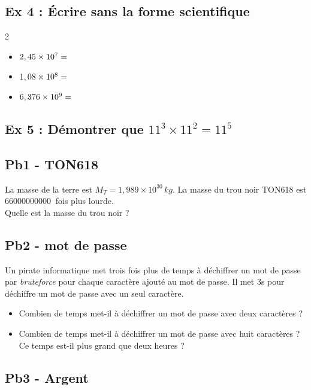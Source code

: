 \subsection*{Ex 4 : Écrire sans la forme scientifique}
\begin{multicols}{2}
  \begin{itemize}[label={$\bullet$}]
  \item $ 2,45 \times 10^{7} = \dotfill$
  \item $ 1,08 \times 10^{8} = \dotfill$
  \item $ 6,376 \times 10^{9} = \dotfill$
  \end{itemize}
\end{multicols}

\subsection*{Ex 5 : Démontrer que $11^3 \times 11^2 = 11^5$}

\subsection*{Pb1 - TON618} 

La masse de la terre est $M_T = 1,989 \times 10^{30} \, kg$. \newline
La masse du trou noir TON618 est $\SI{66 000 000 000}{}$ fois plus lourde. \\

Quelle est la masse du trou noir ?

\subsection*{Pb2 - mot de passe}

Un pirate informatique met trois fois plus de temps à déchiffrer un mot de passe par \textit{bruteforce} pour chaque caractère ajouté au mot de passe. Il met 3s pour déchiffre un mot de passe avec un seul caractère.  

\begin{itemize}
  \item[1.] Combien de temps met-il à déchiffrer un mot de passe avec deux caractères ?
  \item[2.] Combien de temps met-il à déchiffrer un mot de passe avec huit caractères ? \\
  Ce temps est-il plus grand que deux heures ?
\end{itemize}


\subsection*{Pb3 - Argent}

